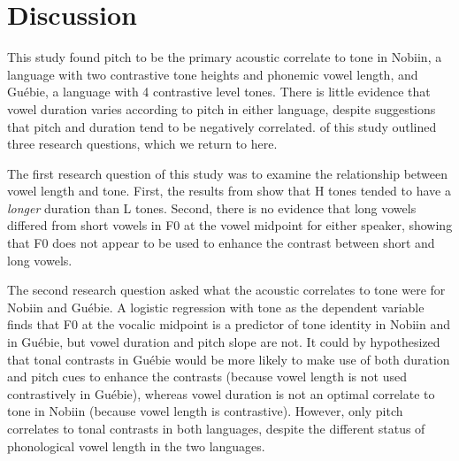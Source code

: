 \documentclass[output=paper]{langscibook}
\begin{document}
\section{Discussion}\label{sec:oakley:4}
This study found pitch to be the primary acoustic correlate to tone in Nobiin, a language with two contrastive tone heights and phonemic vowel length, and Guébie, a language with 4 contrastive level tones. There is little evidence that vowel duration varies according to pitch in either language, despite suggestions that pitch and duration tend to be negatively correlated.  of this study outlined three research questions, which we return to here.

The first research question of this study was to examine the relationship between vowel length and tone. First, the results from  show that H tones tended to have a \textit{longer} duration than L tones. Second, there is no evidence that long vowels differed from short vowels in F0 at the vowel midpoint for either speaker, showing that F0 does not appear to be used to enhance the contrast between short and long vowels.

The second research question asked what the acoustic correlates to tone were for Nobiin and Guébie. A logistic regression with tone as the dependent variable finds that F0 at the vocalic midpoint is a predictor of tone identity in Nobiin and in Guébie, but vowel duration and pitch slope are not. It could by hypothesized that tonal contrasts in Guébie would be more likely to make use of both duration and pitch cues to enhance the contrasts (because vowel length is not used contrastively in Guébie), whereas vowel duration is not an optimal correlate to tone in Nobiin (because vowel length is contrastive). However, only pitch correlates to tonal contrasts in both languages, despite the different status of phonological vowel length in the two languages.
\end{document}
